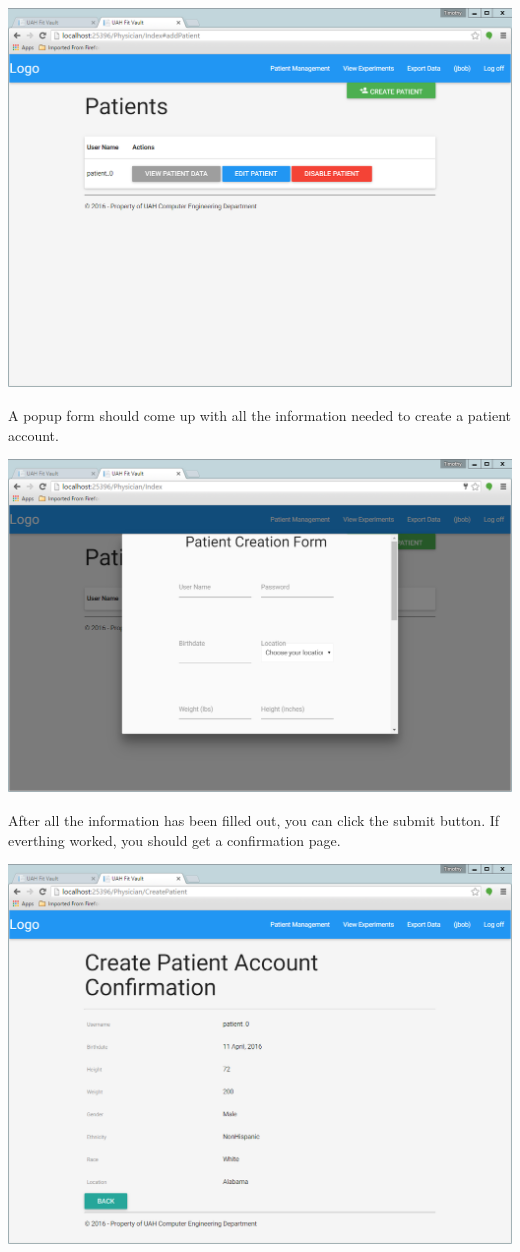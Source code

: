 \documentclass[letterpaper,10pt,english]{sphinxmanual}
\begin{document}
\includegraphics{patient_management.png}

A popup form should come up with all the information needed to create a patient account.

\includegraphics{create_patient.png}

After all the information has been filled out, you can click the submit button. If everthing worked, you should get a
confirmation page.

\includegraphics{create_patient_confirmation.png}
\end{document}

